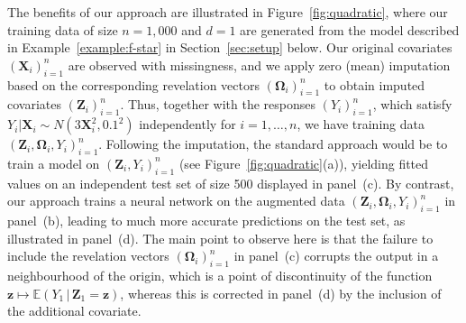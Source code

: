 \documentclass[12pt]{article}
\newcommand{\red}[1]{\textcolor{red}{#1}}
\begin{document}
The benefits of our approach are illustrated in Figure~\ref{fig:quadratic}, where our training data of size $n = 1{,}000$ and $d=1$ are generated from the model described in Example~\ref{example:f-star} in Section~\ref{sec:setup} below.  Our original covariates $(\bm X_i)_{i=1}^n$ are observed with missingness, and we apply zero (mean) imputation based on the corresponding revelation vectors $(\bm \Omega_i)_{i=1}^n$ to obtain imputed covariates $(\bm Z_i)_{i=1}^n$.  Thus, together with the responses $(Y_i)_{i=1}^n$, which satisfy $Y_i|\bm X_i \sim  N(3\bm X_i^2,0.1^2)$ independently for $i=1,\ldots,n$, we have training data $(\bm Z_i, \bm \Omega_i, Y_i)_{i=1}^n$.  Following the imputation, the standard approach would be to train a model on $(\bm Z_i, Y_i)_{i=1}^n$ (see Figure~\ref{fig:quadratic}(a)), yielding fitted values on an independent test set of size 500 displayed in panel~(c).  By contrast, our approach trains a neural network on the augmented data $(\bm Z_i, \bm \Omega_i, Y_i)_{i=1}^n$ in panel~(b), leading to much more accurate predictions on the test set, as illustrated in panel~(d).  The main point to observe here is that the failure to include the revelation vectors $(\bm\Omega_i)_{i=1}^n$ in panel~(c) corrupts the output in a neighbourhood of the origin, which is a point of discontinuity of the function $\bm z \mapsto \mathbb{E}(Y_1 \, | \, \bm Z_1 = \bm z)$, whereas this is corrected in panel~(d) by the inclusion of the additional covariate.
\end{document}
